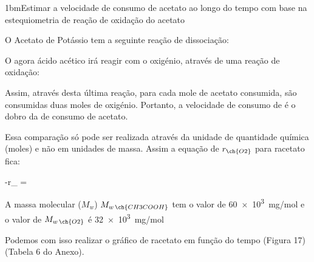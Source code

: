 \documentclass[\mainfilename]{subfiles}
\begin{document}
\begin{sectionBox}1bm{Estimar a velocidade de consumo de acetato ao longo do tempo com base na estequiometria de reação de oxidação do acetato} %
    
    O Acetato de Potássio tem a seguinte reação de dissociação:
    \begin{center}\large
    \end{center}
    O agora ácido acético irá reagir com o oxigénio, através de uma reação de oxidação:
    \begin{center}\large
    \end{center}
    Assim, através desta última reação, para cada mole de acetato consumida, são consumidas duas moles de oxigénio. Portanto, a velocidade de consumo de  é o dobro da de consumo de acetato.\par

    Essa comparação só pode ser realizada através da unidade de quantidade química (moles) e não em unidades de massa. Assim a equação de \(r_{\ch{O2}}\) para racetato fica:
    \begin{BM}
        -r_{}
        = 
        \,
    \end{BM}
    A massa molecular (\(M_w\)) \(M_{w\,\ch{CH3COOH}}\) tem o valor de \SI{60e3}{\milli\gram/\mole} e o valor de \(M_{w\,\ch{O2}}\) é \SI{32e3}{\milli\gram/\mole}\par


    Podemos com isso realizar o gráfico de racetato em função do tempo (Figura 17) (Tabela 6 do Anexo).

    \begin{center}
\end{center}
\end{sectionBox}
\end{document}
